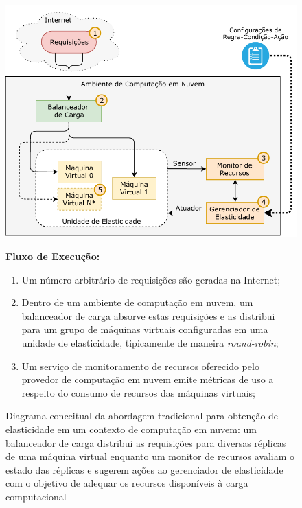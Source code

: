 \documentclass[english,brazilian]{UNISINOSmonografia} %
\begin{document}
\begin{figure}[tbp]
	\centering%
	\begin{minipage}{\textwidth}
		\caption{Diagrama conceitual da abordagem tradicional para obtenção de elasticidade em um contexto de computação em nuvem: um balanceador de carga distribui as requisições para diversas réplicas de uma máquina virtual enquanto um monitor de recursos avaliam o estado das réplicas e sugerem ações ao gerenciador de elasticidade com o objetivo de adequar os recursos disponíveis à carga computacional}
		\label{fig:modelo-lb}
		\includegraphics[width=\textwidth]{modelo-lb}
		\centering
		\begin{minipage}{.8\textwidth}
			\centering
			\small
			\vspace{1ex}
			\textbf{Fluxo de Execução:}
			\begin{enumerate}[leftmargin=*]
				\item Um número arbitrário de requisições são geradas na Internet;
				\item Dentro de um ambiente de computação em nuvem, um balanceador de carga absorve estas requisições e as distribui para um grupo de máquinas virtuais configuradas em uma unidade de elasticidade, tipicamente de maneira \textit{round-robin};
				\item Um serviço de monitoramento de recursos oferecido pelo provedor de computação em nuvem emite métricas de uso a respeito do consumo de recursos das máquinas virtuais;

\end{enumerate}
\end{minipage}
\end{minipage}
\end{figure}
\end{document}
